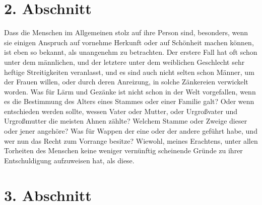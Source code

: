 \section{2. Abschnitt} \label{kap11_ab2}

Dass die Menschen im Allgemeinen stolz auf ihre Person sind, besonders, wenn sie
einigen Anspruch auf vornehme Herkunft oder auf
Schönheit machen können, ist eben
so bekannt, als unangenehm zu betrachten. Der erstere Fall hat oft schon unter
dem männlichen, und der letztere unter dem weiblichen Geschlecht sehr heftige
Streitigkeiten veranlasst, und es sind auch nicht selten schon Männer, um der
Frauen willen, oder durch deren Anreizung, in solche Zänkereien verwickelt
worden. Was für Lärm und Gezänke ist nicht schon in der Welt vorgefallen, wenn
es die Bestimmung des Alters eines Stammes oder einer Familie galt? Oder wenn
entschieden werden sollte, wessen Vater oder Mutter, oder Urgroßvater und
Urgroßmutter die meisten Ahnen zählte? Welchem Stamme oder Zweige dieser oder
jener angehöre? Was für Wappen der eine oder der andere geführt
habe, und wer
nun das Recht zum Vorrange besitze? Wiewohl, meines Erachtens, unter allen
Torheiten des Menschen keine weniger vernünftig scheinende Gründe zu ihrer
Entschuldigung aufzuweisen hat, als diese.

\section{3. Abschnitt} \label{kap11_ab3}


